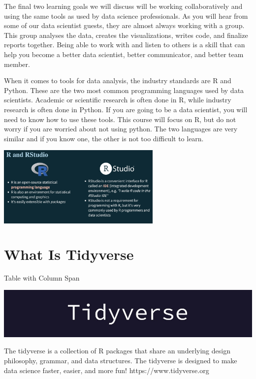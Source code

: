\documentclass[
  letterpaper,
  DIV=11,
  numbers=noendperiod]{scrreprt}
\begin{document}
The final two learning goals we will discuss will be working
collaboratively and using the same tools as used by data science
professionals. As you will hear from some of our data scientist guests,
they are almost always working with a group. This group analyses the
data, creates the visualizations, writes code, and finalize reports
together. Being able to work with and listen to others is a skill that
can help you become a better data scientist, better communicator, and
better team member.

When it comes to tools for data analysis, the industry standards are R
and Python. These are the two most common programming languages used by
data scientists. Academic or scientific research is often done in R,
while industry research is often done in Python. If you are going to be
a data scientist, you will need to know how to use these tools. This
course will focus on R, but do not worry if you are worried about not
using python. The two languages are very similar and if you know one,
the other is not too difficult to learn.

\includegraphics[width=0.6\textwidth,height=\textheight]{./images/WIDS-13.jpg}


\chapter*{What Is Tidyverse}\label{what-is-tidyverse}


Table with Column Span

\includegraphics[width=1\textwidth,height=\textheight]{./images/WIT_2.jpg}

The tidyverse is a collection of R packages that share an underlying
design philosophy, grammar, and data structures. The tidyverse is
designed to make data science faster, easier, and more fun!
https://www.tidyverse.org
\end{document}
